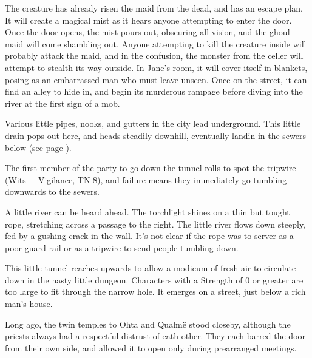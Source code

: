 \begin{multicols}{2}


The creature has already risen the maid from the dead, and has an escape plan.  It will create a magical mist as it hears anyone attempting to enter the door.  Once the door opens, the mist pours out, obscuring all vision, and the ghoul-maid will come shambling out.  Anyone attempting to kill the creature inside will probably attack the maid, and in the confusion, the monster from the celler will attempt to stealth its way outside.  In Jane's room, it will cover itself in blankets, posing as an embarrassed man who must leave unseen.  Once on the street, it can find an alley to hide in, and begin its murderous rampage before diving into the river at the first sign of a mob.


\ghoul


Various little pipes, nooks, and gutters in the city lead underground.  This little drain pops out here, and heads steadily downhill, eventually landin in the sewers below (see page \pageref{slidein}).

The first member of the party to go down the tunnel rolls to spot the tripwire (Wits + Vigilance, TN 8), and failure means they immediately go tumbling downwards to the sewers.

\begin{boxtext}

	A little river can be heard ahead.  The torchlight shines on a thin but tought rope, stretching across a passage to the right.  The little river flows down steeply, fed by a gushing crack in the wall.  It's not clear if the rope was to server as a poor guard-rail or as a tripwire to send people tumbling down.

\end{boxtext}


This little tunnel reaches upwards to allow a modicum of fresh air to circulate down in the nasty little dungeon.  Characters with a Strength of 0 or greater are too large to fit through the narrow hole.  It emerges on a street, just below a rich man's house.

Long ago, the twin temples to Ohta and Qualm\"{e} stood closeby, although the priests always had a respectful distrust of eath other.  They each barred the door from their own side, and allowed it to open only during prearranged meetings.


\end{multicols}
